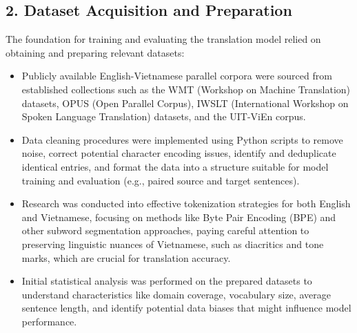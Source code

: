 \documentclass[12pt]{article}
\begin{document}
\subsection*{2. Dataset Acquisition and Preparation}
The foundation for training and evaluating the translation model relied on obtaining and preparing relevant datasets:
\begin{itemize}
    \item Publicly available English-Vietnamese parallel corpora were sourced from established collections such as the WMT (Workshop on Machine Translation) datasets, OPUS (Open Parallel Corpus), IWSLT (International Workshop on Spoken Language Translation) datasets, and the UIT-ViEn corpus.
    \item Data cleaning procedures were implemented using Python scripts to remove noise, correct potential character encoding issues, identify and deduplicate identical entries, and format the data into a structure suitable for model training and evaluation (e.g., paired source and target sentences).
    \item Research was conducted into effective tokenization strategies for both English and Vietnamese, focusing on methods like Byte Pair Encoding (BPE) and other subword segmentation approaches, paying careful attention to preserving linguistic nuances of Vietnamese, such as diacritics and tone marks, which are crucial for translation accuracy.
    \item Initial statistical analysis was performed on the prepared datasets to understand characteristics like domain coverage, vocabulary size, average sentence length, and identify potential data biases that might influence model performance.
\end{itemize}
\end{document}

